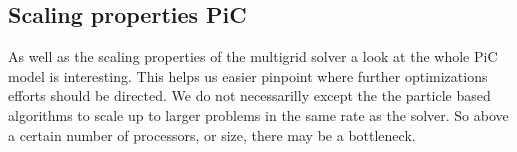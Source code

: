 \subsection{Scaling properties PiC}
	As well as the scaling properties of the multigrid solver a look at the
	whole PiC model is interesting. This helps us easier pinpoint where further
	optimizations efforts should be directed. We do not necessarilly except the
	the particle based algorithms to scale up to larger problems in the same
	rate as	the solver. So above a certain number of processors, or size, there may
	be a bottleneck.
